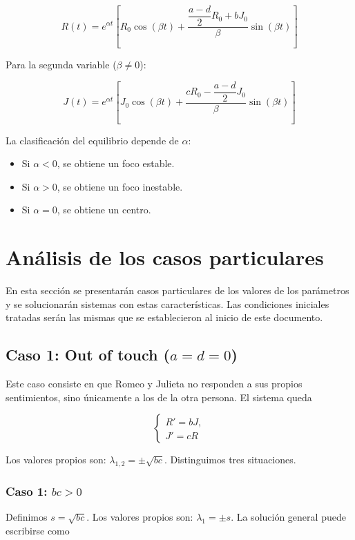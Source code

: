 \documentclass[10pt]{article}
\numberwithin{equation}{section}
\begin{document}
\[
\boxed{
R(t)=e^{\alpha t}
\left[
R_0\cos(\beta t)
+
\frac{
\dfrac{a-d}{2}R_0+bJ_0
}{\beta}
\sin(\beta t)
\right]
}
\]

Para la segunda variable ($\beta \neq 0$):

\[
\boxed{
J(t)=e^{\alpha t}
\left[
J_0\cos(\beta t)
+
\frac{
cR_0-\dfrac{a-d}{2}J_0
}{\beta}
\sin(\beta t)
\right]
}
\]

La clasificación del equilibrio depende de $\alpha$:

\begin{itemize}
    \item Si $\alpha<0$, se obtiene un foco estable.
    \item Si $\alpha>0$, se obtiene un foco inestable.
    \item Si $\alpha=0$, se obtiene un centro.
\end{itemize}

\section{Análisis de los casos particulares}

En esta sección se presentarán casos particulares de los valores de los parámetros y se solucionarán sistemas con estas características.
Las condiciones iniciales tratadas serán las mismas que se establecieron al inicio de este documento.

\subsection{Caso 1: Out of touch ($a = d = 0$)}

Este caso consiste en que Romeo y Julieta no responden a sus propios sentimientos, sino únicamente a los de la otra persona.
El sistema queda

\[
\boxed{
\begin{cases}
R'=bJ,\\
J'=cR
\end{cases}
}
\]

Los valores propios son: $\lambda_{1,2}=\pm\sqrt{bc}$. Distinguimos tres situaciones.

\subsubsection{Caso 1: $bc>0$}

Definimos $s=\sqrt{bc}$. Los valores propios son: $ \lambda_1=\pm s$. La solución general puede escribirse como
\end{document}
